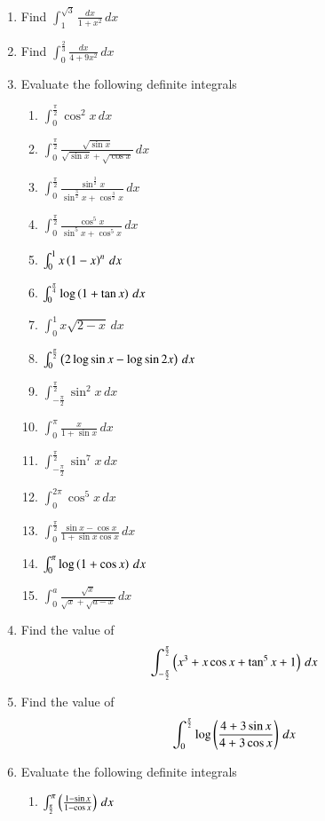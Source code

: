 \begin{enumerate}[label=\arabic*.,ref=\thesubsection.\theenumi]
\item Find $\int_{1}^{\sqrt{3}}\frac{dx}{1+x^2}\, dx$
\item Find $\int_{0}^{\frac{2}{3}}\frac{dx}{4+9x^2}\, dx$
%
\item Evaluate the following definite integrals
%
\begin{enumerate}[label = (\roman*)]
\item $\int_{0}^{\frac{\pi}{2}}\cos^2{x}\, dx$
\item $\int_{0}^{\frac{\pi}{2}}\frac{\sqrt{\sin x}}{\sqrt{\sin x}+\sqrt{\cos x}}\, dx$
\item $\int_{0}^{\frac{\pi}{2}}\frac{\sin^{\frac{3}{2}} x}{\sin^{\frac{3}{2}} x+\cos^{\frac{3}{2}} x}\, dx$
\item $\int_{0}^{\frac{\pi}{2}}\frac{\cos^5 x}{\sin^5 x+\cos^5 x}\, dx$
\item $\int_{0}^{1}x\left(1-x\right)^n\, dx$
\item $\int_{0}^{\frac{\pi}{4}}\log\left(1+\tan x\right)\, dx$
\item $\int_{0}^{1}x\sqrt{2-x}\, dx$
\item $\int_{0}^{\frac{\pi}{2}}\left(2\log\sin x - \log \sin 2x\right)\, dx$
\item $\int_{-\frac{\pi}{2}}^{\frac{\pi}{2}}\sin^2 x\, dx$
\item $\int_{0}^{\pi}\frac{x}{1+\sin x}\, dx$
\item $\int_{-\frac{\pi}{2}}^{\frac{\pi}{2}}\sin^7 x\, dx$
\item $\int_{0}^{2\pi}\cos^5 x\, dx$
\item $\int_{0}^{\frac{\pi}{2}}\frac{\sin x - \cos x}{1+\sin x \cos x}\, dx$
\item $\int_{0}^{\pi}\log\left(1+\cos x\right)\, dx$
\item $\int_{0}^{a}\frac{\sqrt{x}}{\sqrt{x}+\sqrt{a-x}}\, dx$
\end{enumerate}
%
\item Find the value of 
%
\begin{align}
\int_{-\frac{\pi}{2}}^{\frac{\pi}{2}}\left(x^3+x\cos x + \tan^5 x + 1\right)\,dx
\end{align}
%
\item Find the value of 
%
\begin{align}
\int_{0}^{\frac{\pi}{2}}\log\left(\frac{4+3\sin x}{4+3\cos x}\right)\,dx
\end{align}
\item Evaluate the following definite integrals
%
\begin{enumerate}[label = (\roman*)]
\item $\int_{\frac{\pi}{2}}^{\pi}\left(\frac{1-\sin x}{1-\cos x}\right)\, dx$

\end{enumerate}
\end{enumerate}
